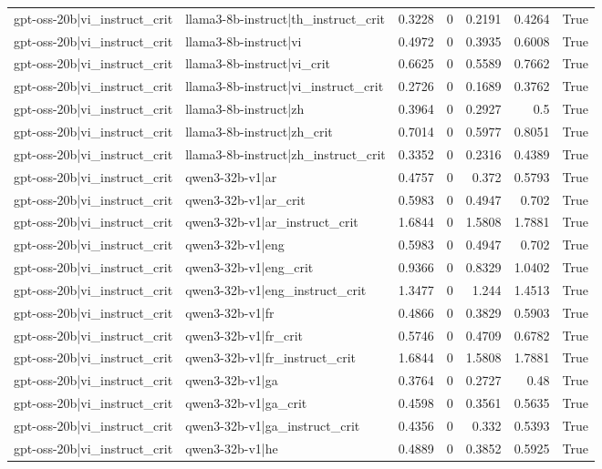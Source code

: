 \begin{table}
\begin{tabular}{l l r r r r l}
gpt-oss-20b|vi_instruct_crit & llama3-8b-instruct|th_instruct_crit & 0.3228 & 0 & 0.2191 & 0.4264 & True \\
gpt-oss-20b|vi_instruct_crit & llama3-8b-instruct|vi & 0.4972 & 0 & 0.3935 & 0.6008 & True \\
gpt-oss-20b|vi_instruct_crit & llama3-8b-instruct|vi_crit & 0.6625 & 0 & 0.5589 & 0.7662 & True \\
gpt-oss-20b|vi_instruct_crit & llama3-8b-instruct|vi_instruct_crit & 0.2726 & 0 & 0.1689 & 0.3762 & True \\
gpt-oss-20b|vi_instruct_crit & llama3-8b-instruct|zh & 0.3964 & 0 & 0.2927 & 0.5 & True \\
gpt-oss-20b|vi_instruct_crit & llama3-8b-instruct|zh_crit & 0.7014 & 0 & 0.5977 & 0.8051 & True \\
gpt-oss-20b|vi_instruct_crit & llama3-8b-instruct|zh_instruct_crit & 0.3352 & 0 & 0.2316 & 0.4389 & True \\
gpt-oss-20b|vi_instruct_crit & qwen3-32b-v1|ar & 0.4757 & 0 & 0.372 & 0.5793 & True \\
gpt-oss-20b|vi_instruct_crit & qwen3-32b-v1|ar_crit & 0.5983 & 0 & 0.4947 & 0.702 & True \\
gpt-oss-20b|vi_instruct_crit & qwen3-32b-v1|ar_instruct_crit & 1.6844 & 0 & 1.5808 & 1.7881 & True \\
gpt-oss-20b|vi_instruct_crit & qwen3-32b-v1|eng & 0.5983 & 0 & 0.4947 & 0.702 & True \\
gpt-oss-20b|vi_instruct_crit & qwen3-32b-v1|eng_crit & 0.9366 & 0 & 0.8329 & 1.0402 & True \\
gpt-oss-20b|vi_instruct_crit & qwen3-32b-v1|eng_instruct_crit & 1.3477 & 0 & 1.244 & 1.4513 & True \\
gpt-oss-20b|vi_instruct_crit & qwen3-32b-v1|fr & 0.4866 & 0 & 0.3829 & 0.5903 & True \\
gpt-oss-20b|vi_instruct_crit & qwen3-32b-v1|fr_crit & 0.5746 & 0 & 0.4709 & 0.6782 & True \\
gpt-oss-20b|vi_instruct_crit & qwen3-32b-v1|fr_instruct_crit & 1.6844 & 0 & 1.5808 & 1.7881 & True \\
gpt-oss-20b|vi_instruct_crit & qwen3-32b-v1|ga & 0.3764 & 0 & 0.2727 & 0.48 & True \\
gpt-oss-20b|vi_instruct_crit & qwen3-32b-v1|ga_crit & 0.4598 & 0 & 0.3561 & 0.5635 & True \\
gpt-oss-20b|vi_instruct_crit & qwen3-32b-v1|ga_instruct_crit & 0.4356 & 0 & 0.332 & 0.5393 & True \\
gpt-oss-20b|vi_instruct_crit & qwen3-32b-v1|he & 0.4889 & 0 & 0.3852 & 0.5925 & True \\

\end{tabular}
\end{table}
